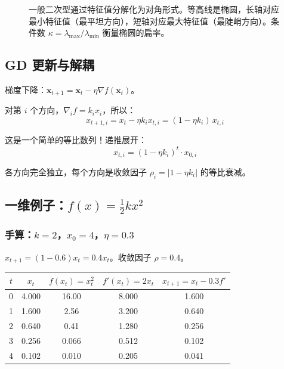\documentclass[12pt, a4paper]{ctexart}
\begin{document}
\begin{figure}[ht]
\caption{一般二次型通过特征值分解化为对角形式。等高线是椭圆，长轴对应最小特征值（最平坦方向），短轴对应最大特征值（最陡峭方向）。条件数 $\kappa = \lambda_{\max}/\lambda_{\min}$ 衡量椭圆的扁率。}
\end{figure}

\subsection{GD 更新与解耦}

梯度下降：$\bm{x}_{t+1} = \bm{x}_t - \eta \nabla f(\bm{x}_t)$。

对第 $i$ 个方向，$\nabla_i f = k_i x_i$，所以：
\begin{equation}
    x_{t+1,i} = x_t - \eta k_i x_{t,i} = (1 - \eta k_i)\, x_{t,i}
\end{equation}

这是一个简单的等比数列！递推展开：
\begin{equation}
    \boxed{x_{t,i} = (1 - \eta k_i)^t \cdot x_{0,i}}
\end{equation}

各方向完全独立，每个方向是收敛因子 $\rho_i = |1 - \eta k_i|$ 的等比衰减。

\subsection{一维例子：$f(x) = \frac{1}{2}kx^2$}

\subsubsection{手算：$k = 2$，$x_0 = 4$，$\eta = 0.3$}

$x_{t+1} = (1 - 0.6)x_t = 0.4 x_t$。收敛因子 $\rho = 0.4$。

\begin{center}
\begin{tabular}{c|cccc}
$t$ & $x_t$ & $f(x_t) = x_t^2$ & $f'(x_t) = 2x_t$ & $x_{t+1} = x_t - 0.3f'$ \\
\hline
0 & 4.000 & 16.00 & 8.000 & 1.600 \\
1 & 1.600 & 2.56 & 3.200 & 0.640 \\
2 & 0.640 & 0.41 & 1.280 & 0.256 \\
3 & 0.256 & 0.066 & 0.512 & 0.102 \\
4 & 0.102 & 0.010 & 0.205 & 0.041 \\
\end{tabular}
\end{center}
\end{document}
